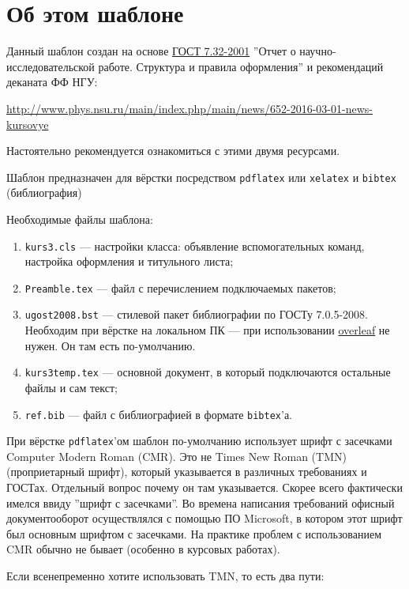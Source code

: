 
\chapter{Об этом шаблоне}\label{ch:about}


Данный шаблон создан на основе \href{https://docs.cntd.ru/document/1200026224}{ГОСТ 7.32-2001} ''Отчет о научно-иссле\-до\-ва\-тельской работе. Структура и правила оформления'' и рекомендаций деканата ФФ НГУ:

\href{http://www.phys.nsu.ru/main/index.php/main/news/652-2016-03-01-news-kursovye}{\small http://www.phys.nsu.ru/main/index.php/main/news/652-2016-03-01-news-kursovye}

Настоятельно рекомендуется ознакомиться с этими двумя ресурсами.

Шаблон предназначен для вёрстки посредством \verb*|pdflatex| или \verb*|xelatex| и \verb*|bibtex| (библиография)

Необходимые файлы шаблона:
\begin{enumerate}
	\item \verb*|kurs3.cls| --- настройки класса: объявление вспомогательных команд, настройка оформления и титульного листа;
	\item \verb*|Preamble.tex| --- файл с перечислением подключаемых пакетов;
	\item \verb*|ugost2008.bst| --- стилевой пакет библиографии по ГОСТу 7.0.5-2008. Необходим при вёрстке на локальном ПК --- при использовании \href{https://www.overleaf.com}{overleaf} не нужен. Он там есть по-умолчанию.
	\item \verb*|kurs3temp.tex| --- основной документ, в который подключаются остальные файлы и сам текст;
	\item  \verb*|ref.bib| --- файл с библиографией в формате \verb*|bibtex|'а.
\end{enumerate}

При вёрстке \verb*|pdflatex|'ом шаблон по-умолчанию использует шрифт с засечками Computer Modern Roman (CMR). Это не Times New Roman (TMN) (проприетарный шрифт), который указывается в различных требованиях и ГОСТах. Отдельный вопрос почему он там указывается. Скорее всего фактически имелся ввиду ''шрифт с засечками''. Во времена написания требований офисный документооборот осуществлялся с помощью ПО Microsoft, в котором этот шрифт был основным шрифтом с засечками. На практике проблем с использованием CMR обычно не бывает (особенно в курсовых работах).

Если всенепременно хотите использовать TMN, то есть два пути:

